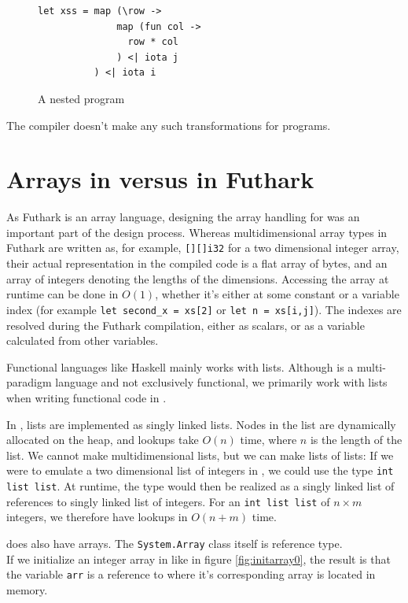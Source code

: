 \begin{figure}[h]
  \centering
\begin{verbatim}
let xss = map (\row ->
              map (fun col ->
                row * col
              ) <| iota j
          ) <| iota i
\end{verbatim}
  \caption{A nested \fshark{} program}
  \label{fig:fsharpnested}
\end{figure}

The \fsharp{} compiler doesn't make any such transformations for \fshark{} programs.

\section{Arrays in \fsharp{} versus in Futhark}

As Futhark is an array language, designing the array handling for \fshark{} was
an important part of the design process.
Whereas multidimensional array types in Futhark are written as, for example,
\texttt{[][]i32} for a two dimensional integer array, their actual representation 
in the compiled code is a flat array of bytes, and an array of integers denoting 
the lengths of the dimensions.
Accessing the array at runtime can be done in $O(1)$, whether it's
either at some constant or a variable index (for example \texttt{let second\_x = xs[2]} or \texttt{let n = xs[i,j]}).
The indexes are resolved during the Futhark compilation, either as scalars, or
as a variable calculated from other variables.

Functional languages like Haskell mainly works with lists. Although \fsharp{} is
a multi-paradigm language and not exclusively functional, we primarily work with
lists when writing functional code in \fsharp{}.

In \fsharp{}, lists are implemented as singly linked lists. Nodes in the
list are dynamically allocated on the heap, and lookups take $O(n)$ time, where
$n$ is the length of the list.
We cannot make multidimensional lists, but we can make lists of lists: If we
were to emulate a two dimensional list of integers in \fsharp{}, we could use
the type \texttt{int list list}. At runtime, the type would then be realized as
a singly linked list of references to singly linked list of integers.
For an \texttt{int list list} of $n \times m$ integers, we therefore have
lookups in $O(n+m)$ time.

\fsharp{} does also have arrays. The \texttt{System.Array} class itself is reference
type.\\
If we initialize an integer array in \fsharp{} like in figure
\ref{fig:initarray0}, the result is that the variable \texttt{arr} is a reference to where it's corresponding
array is located in memory. 

